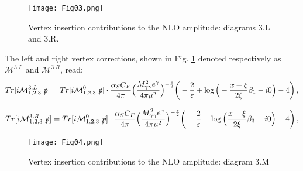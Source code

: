 \documentclass[aps,prd,superscriptaddress,floatfix,showpacs]{revtex4}
\begin{document}
\begin{figure}[h]
    \centering
\texttt{[image: Fig03.png]}
    \caption{Vertex insertion contributions to the NLO amplitude: diagrams 3.L and 3.R.}
    \label{3LR}
\end{figure}
The left and right vertex corrections, shown in Fig. \ref{3LR}  denoted respectively as $\mathcal{M}^{3.L}$ and $\mathcal{M}^{3.R}$, read:
\begin{align}
Tr[i\mathcal{M}^{3.L}_{1,2,3}~\slashed{p}]
=Tr[i\mathcal{M}^{0}_{1,2,3}~\slashed{p}]\cdot
\frac{\alpha_S C_F}{4\pi}\Big( \frac{M^2_{\gamma\gamma} e^\gamma}{4\pi\mu^2} \Big)^{-\frac{\varepsilon}{2}}
\bigg{(} 
-\frac{2}{\varepsilon} + \log\Big(-\frac{x+\xi}{2\xi}\beta_1 -i0\Big)- 4 
\bigg{)}\,,
\label{eq:3L}
\end{align}

\begin{align}
Tr[i\mathcal{M}^{3.R}_{1,2,3}~\slashed{p}]
=Tr[i\mathcal{M}^{0}_{1,2,3}~\slashed{p}]\cdot
\frac{\alpha_S C_F}{4\pi}\Big( \frac{M^2_{\gamma\gamma} e^\gamma}{4\pi\mu^2} \Big)^{-\frac{\varepsilon}{2}}
\bigg{(} 
-\frac{2}{\varepsilon} + \log\Big(\frac{x-\xi}{2\xi}\beta_3 -i0\Big)- 4 
\bigg{)}\,,
\label{eq:3R}
\end{align}


\begin{figure}[h]
    \centering
\texttt{[image: Fig04.png]}
    \caption{Vertex insertion contributions to the NLO amplitude: diagram 3.M}
    \label{3M}
\end{figure}
\end{document}
